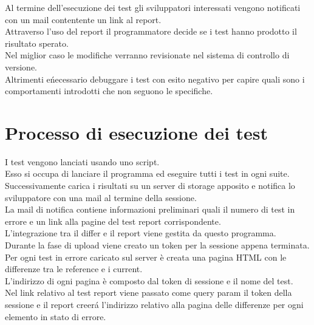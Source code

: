         Al termine dell'esecuzione dei test gli sviluppatori interessati vengono notificati con un mail contentente un link al report.\\
        Attraverso l'uso del report il programmatore decide se i test hanno prodotto il risultato sperato.\\
        Nel miglior caso le modifiche verranno revisionate nel sistema di controllo di versione.\\
        Altrimenti e\' necessario debuggare i test con esito negativo per capire quali sono i comportamenti introdotti che non seguono le specifiche. \\

    \section{Processo di esecuzione dei test\label{testexecution}}
        I test vengono lanciati usando uno script.\\
        Esso si occupa di lanciare il programma ed eseguire tutti i test in ogni suite.\\
        Successivamente carica i risultati su un server di storage apposito e notifica lo sviluppatore con una mail al termine della sessione.\\

        La mail di notifica contiene informazioni preliminari quali il numero di test in errore e un link alla pagine del test report corrispondente.\\

        L'integrazione tra il differ e il report viene gestita da questo programma.\\
        Durante la fase di upload viene creato un token per la sessione appena terminata.\\
        Per ogni test in errore caricato sul server è creata una pagina HTML con le differenze tra le reference e i current.\\
        
        L'indirizzo di ogni pagina è composto dal token di sessione e il nome del test.\\
        Nel link relativo al test report viene passato come query param il token della sessione e il report creer\'a l'indirizzo relativo alla pagina delle differenze per ogni elemento in stato di errore.\\
